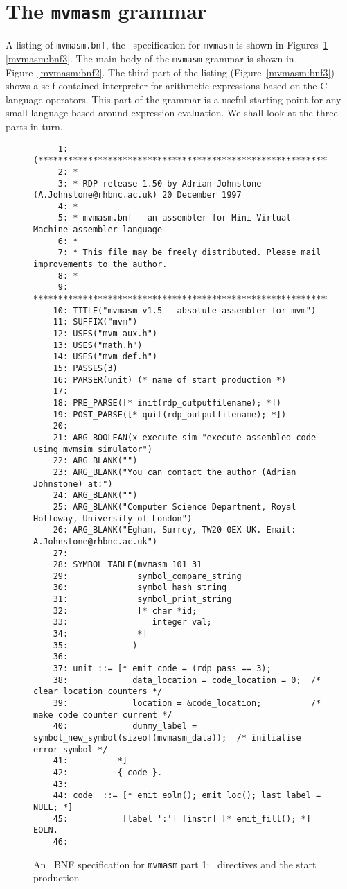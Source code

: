 \section{The {\tt mvmasm} grammar}

A listing of {\tt mvmasm.bnf}, the \rdp\ specification for {\tt mvmasm}
is shown in Figures~\ref{mvmasm:bnf1}--\ref{mvmasm:bnf3}. The main body
of the {\tt mvmasm} grammar is shown in Figure~\ref{mvmasm:bnf2}. The
third part of the listing (Figure~\ref{mvmasm:bnf3}) shows a self contained interpreter for
arithmetic expressions based on the C-language operators. This part of
the grammar is a useful starting point for any small language based
around expression evaluation. We shall look at the three parts in turn.

\begin{figure}
\hspace*{-3cm}
\begin{minipage}{30cm}
\footnotesize
\begin{verbatim}
     1: (*******************************************************************************
     2: *
     3: * RDP release 1.50 by Adrian Johnstone (A.Johnstone@rhbnc.ac.uk) 20 December 1997
     4: *
     5: * mvmasm.bnf - an assembler for Mini Virtual Machine assembler language
     6: *
     7: * This file may be freely distributed. Please mail improvements to the author.
     8: *
     9: *******************************************************************************)
    10: TITLE("mvmasm v1.5 - absolute assembler for mvm")
    11: SUFFIX("mvm")
    12: USES("mvm_aux.h")
    13: USES("math.h")
    14: USES("mvm_def.h")
    15: PASSES(3)
    16: PARSER(unit) (* name of start production *)
    17: 
    18: PRE_PARSE([* init(rdp_outputfilename); *])
    19: POST_PARSE([* quit(rdp_outputfilename); *])
    20: 
    21: ARG_BOOLEAN(x execute_sim "execute assembled code using mvmsim simulator")
    22: ARG_BLANK("")
    23: ARG_BLANK("You can contact the author (Adrian Johnstone) at:")
    24: ARG_BLANK("")
    25: ARG_BLANK("Computer Science Department, Royal Holloway, University of London")
    26: ARG_BLANK("Egham, Surrey, TW20 0EX UK. Email: A.Johnstone@rhbnc.ac.uk")
    27: 
    28: SYMBOL_TABLE(mvmasm 101 31
    29:              symbol_compare_string
    30:              symbol_hash_string
    31:              symbol_print_string
    32:              [* char *id;
    33:                 integer val;
    34:              *]
    35:             )
    36: 
    37: unit ::= [* emit_code = (rdp_pass == 3);
    38:             data_location = code_location = 0;  /* clear location counters */
    39:             location = &code_location;          /* make code counter current */
    40:             dummy_label = symbol_new_symbol(sizeof(mvmasm_data));  /* initialise error symbol */
    41:          *]
    42:          { code }.
    43: 
    44: code  ::= [* emit_eoln(); emit_loc(); last_label = NULL; *]
    45:           [label ':'] [instr] [* emit_fill(); *] EOLN.
    46: 
\end{verbatim}
\end{minipage}
\caption{An \rdp\ BNF specification for {\tt mvmasm} part 1: \rdp\
directives and the start production}
\label{mvmasm:bnf1}
\end{figure}
